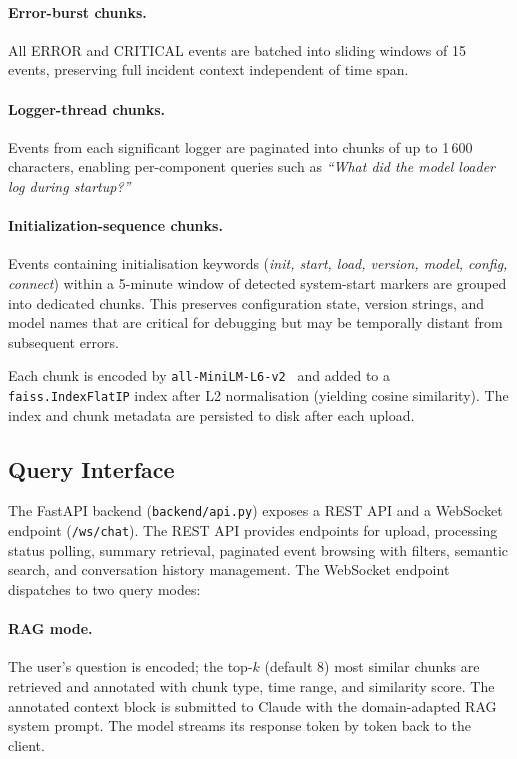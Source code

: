 \documentclass[runningheads]{llncs}
\begin{document}
\paragraph{Error-burst chunks.}
All ERROR and CRITICAL events are batched into sliding windows of 15 events,
preserving full incident context independent of time span.

\paragraph{Logger-thread chunks.}
Events from each significant logger are paginated into chunks of up to
1\,600 characters, enabling per-component queries such as \emph{``What did
the model loader log during startup?''}

\paragraph{Initialization-sequence chunks.}
Events containing initialisation keywords (\emph{init, start, load, version,
model, config, connect}) within a 5-minute window of detected system-start
markers are grouped into dedicated chunks. This preserves configuration state,
version strings, and model names that are critical for debugging but may be
temporally distant from subsequent errors.

Each chunk is encoded by \texttt{all-MiniLM-L6-v2}~\cite{
reimers2019sentencebert} and added to a \texttt{faiss.IndexFlatIP} index after
L2 normalisation (yielding cosine similarity). The index and chunk metadata
are persisted to disk after each upload.

\subsection{Query Interface}
\label{ssec:interface}

The FastAPI backend (\texttt{backend/api.py}) exposes a REST API and a
WebSocket endpoint (\texttt{/ws/chat}). The REST API provides endpoints for
upload, processing status polling, summary retrieval, paginated event browsing
with filters, semantic search, and conversation history management. The
WebSocket endpoint dispatches to two query modes:

\paragraph{RAG mode.}
The user's question is encoded; the top-$k$ (default 8) most similar chunks
are retrieved and annotated with chunk type, time range, and similarity score.
The annotated context block is submitted to Claude with the domain-adapted
RAG system prompt. The model streams its response token by token back to the
client.
\end{document}
